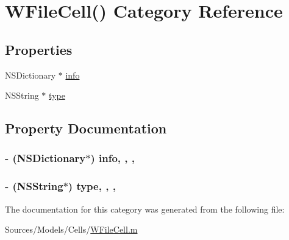 \hypertarget{category_w_file_cell_07_08}{\section{W\-File\-Cell() Category Reference}
\label{category_w_file_cell_07_08}
}
\subsection*{Properties}
\begin{DoxyCompactItemize}
\item 
N\-S\-Dictionary $\ast$ \hyperlink{category_w_file_cell_07_08_a0daab021a50b4576220f6e67077d6dc3}{info}
\item 
N\-S\-String $\ast$ \hyperlink{category_w_file_cell_07_08_aaf6fb7cb92177550abe0e2394a2c0e2b}{type}
\end{DoxyCompactItemize}


\subsection{Property Documentation}
\hypertarget{category_w_file_cell_07_08_a0daab021a50b4576220f6e67077d6dc3}{
\subsubsection[{info}]{\setlength{\rightskip}{0pt plus 5cm}-\/ (N\-S\-Dictionary$\ast$) info\hspace{0.3cm}{\ttfamily [read]}, {\ttfamily [write]}, {\ttfamily [nonatomic]}, {\ttfamily [retain]}}}\label{category_w_file_cell_07_08_a0daab021a50b4576220f6e67077d6dc3}
\hypertarget{category_w_file_cell_07_08_aaf6fb7cb92177550abe0e2394a2c0e2b}{
\subsubsection[{type}]{\setlength{\rightskip}{0pt plus 5cm}-\/ (N\-S\-String$\ast$) type\hspace{0.3cm}{\ttfamily [read]}, {\ttfamily [write]}, {\ttfamily [nonatomic]}, {\ttfamily [retain]}}}\label{category_w_file_cell_07_08_aaf6fb7cb92177550abe0e2394a2c0e2b}


The documentation for this category was generated from the following file\-:\begin{DoxyCompactItemize}
\item 
Sources/\-Models/\-Cells/\hyperlink{_w_file_cell_8m}{W\-File\-Cell.\-m}\end{DoxyCompactItemize}
